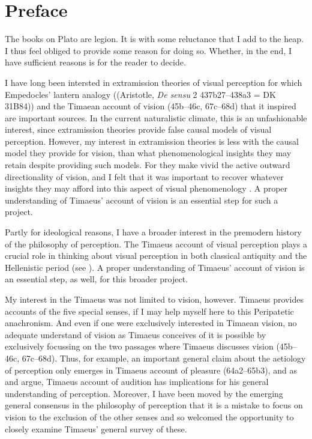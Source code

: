 \chapter*{Preface} %
\label{cha:preface}

The books on Plato are legion. It is with some reluctance that I add to the heap. I thus feel obliged to provide some reason for doing so. Whether, in the end, I have sufficient reasons is for the reader to decide.

I have long been intersted in extramission theories of visual perception for which Empedocles' lantern analogy ((Aristotle, \emph{De sensu} 2 437b27–438a3 = DK 31B84)) and the Timaean account of vision (45b–46c, 67c–68d) that it inspired are important sources. In the current naturalistic climate, this is an unfashionable interest, since extramission theories provide false causal models of visual perception. However, my interest in extramission theories is less with the causal model they provide for vision, than what phenomenological insights they may retain despite providing such models. For they make vivid the active outward directionality of vision, and I felt that it was important to recover whatever insights they may afford into this aspect of visual phenomenology \cite[chapter 5]{Kalderon:2018oe}. A proper understanding of Timaeus' account of vision is an essential step for such a project.

Partly for ideological reasons, I have a broader interest in the premodern history of the philosophy of perception. The Timaeus account of visual perception plays a crucial role in thinking about visual perception in both classical antiquity and the Hellenistic period (see \citealt[chapter 1]{Lindberg:1977aa}). A proper understanding of Timaeus' account of vision is an essential step, as well, for this broader project.

My interest in the Timaeus was not limited to vision, however. Timaeus provides accounts of the five special senses, if I may help myself here to this Peripatetic anachronism. And even if one were exclusively interested in Timaean vision, no adequate understand of vision as Timaeus conceives of it is possible by exclusively focussing on the two passages where Timaeus discusses vision (45b–46c, 67c–68d). Thus, for example, an important general claim about the aetiology of perception only emerges in Timaeus account of pleasure (64a2–65b3), and as \citet{Barker:2000dy} and \citet{Lautner:2005aa} argue, Timaeus account of audition has implications for his general understanding of perception. Moreover, I have been moved by the emerging general consensus in the philosophy of perception that it is a mistake to focus on vision to the exclusion of the other senses and so welcomed the opportunity to closely examine Timaeus' general survey of these.

